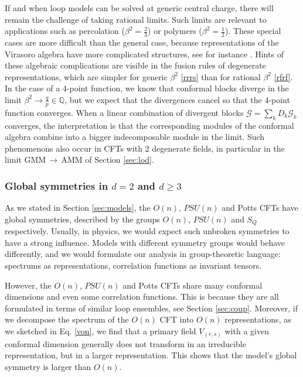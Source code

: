 \documentclass[12pt, a4paper]{article}
\begin{document}
If and when loop models can be solved at generic central charge, there will remain the challenge of taking rational limits. Such limits are relevant to applications such as percolation ($\beta^2=\frac23$) or polymers ($\beta^2=\frac12$). These special cases are more difficult than the general case, because representations of the Virasoro algebra have more complicated structures, see for instance \cite{hs21}. Hints of these algebraic complications are visible in the fusion rules of degenerate representations, which are simpler for generic $\beta^2$ \eqref{rrrs} than for rational $\beta^2$ \eqref{rfrf}. In the case of a 4-point function, we know that conformal blocks diverge in the limit $\beta^2\to \frac{q}{p}\in\mathbb{Q}$, but we expect that the divergences cancel so that the 4-point function converges. When a linear combination of divergent blocks $\mathcal{G} = \sum_k D_k \mathcal{G}_k$ converges, the interpretation is that the corresponding modules of the conformal algebra combine into a bigger indecomposable module in the limit. Such phenomenons also occur in CFTs with 2 degenerate fields, in particular in the limit GMM\,$\to$\,AMM of Section \ref{sec:lod}. 

\subsubsection{Global symmetries in $d=2$ and $d\geq 3$}

As we stated in Section \ref{sec:models}, the $O(n)$, $PSU(n)$ and Potts CFTs have global symmetries, described by the groups $O(n)$, $PSU(n)$ and $S_Q$ respectively. Usually, in physics, we would expect such unbroken symmetries to have a strong influence. Models with different symmetry groups would behave differently, and we would formulate our analysis in group-theoretic language: spectrums as representations, correlation functions as invariant tensors. 

However, the $O(n)$, $PSU(n)$ and Potts CFTs share many conformal dimensions and even some correlation functions.
This is because they are all formulated in terms of similar loop ensembles, see Section \ref{sec:coup}.
Moreover, if we decompose the spectrum of the $O(n)$ CFT into $O(n)$ representations, as we sketched in Eq. \eqref{von}, we find that a primary field $V_{(r,s)}$ with a given conformal dimension generally does not transform in an irreducible representation, but in a larger representation. This shows that the model's global symmetry is larger than $O(n)$. 
\end{document}
